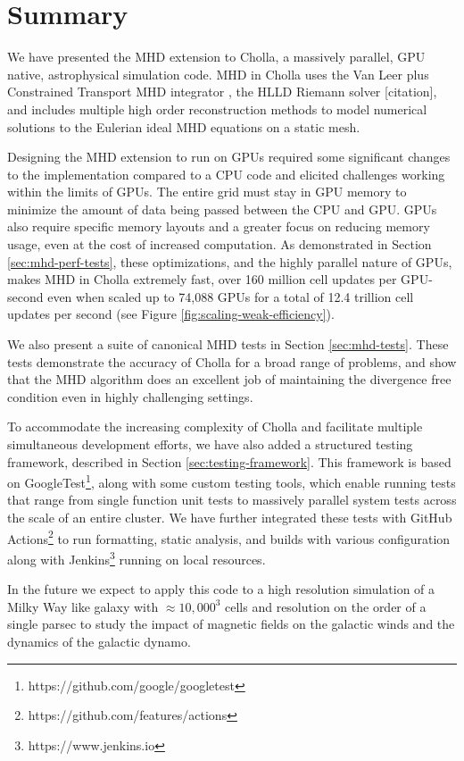 \section{Summary}
\label{sec:summary}

We have presented the MHD extension to Cholla, a massively parallel, GPU native, astrophysical simulation code. MHD in Cholla uses the Van Leer plus Constrained Transport MHD integrator \citep{stone_2009}, the HLLD Riemann solver [citation], and includes multiple high order reconstruction methods to model numerical solutions to the Eulerian ideal MHD equations on a static mesh.

Designing the MHD extension to run on GPUs required some significant changes to the implementation compared to a CPU code and elicited challenges working within the limits of GPUs. The entire grid must stay in GPU memory to minimize the amount of data being passed between the CPU and GPU. GPUs also require specific memory layouts and a greater focus on reducing memory usage, even at the cost of increased computation. As demonstrated in Section \ref{sec:mhd-perf-tests}, these optimizations, and the highly parallel nature of GPUs, makes MHD in Cholla extremely fast, over 160 million cell updates per GPU-second even when scaled up to 74,088 GPUs for a total of 12.4 trillion cell updates per second (see Figure \ref{fig:scaling-weak-efficiency}).

We also present a suite of canonical MHD tests in Section \ref{sec:mhd-tests}. These tests demonstrate the accuracy of Cholla for a broad range of problems, and show that the MHD algorithm does an excellent job of maintaining the divergence free condition even in highly challenging settings. 

To accommodate the increasing complexity of Cholla and facilitate multiple simultaneous development efforts,  we have also added a structured testing framework, described in Section \ref{sec:testing-framework}. This framework is based on  GoogleTest\footnote{https://github.com/google/googletest}, along  with some custom testing tools, which enable running tests that range from single function unit tests to massively parallel system tests across the scale of an entire cluster. We have further integrated these tests with GitHub Actions\footnote{https://github.com/features/actions} to run formatting, static analysis, and builds with various configuration along with Jenkins\footnote{https://www.jenkins.io} running on local resources.

In the future we expect to apply this code to a high resolution simulation of a Milky Way like galaxy with $\approx 10,000^3$ cells and resolution on the order of a single parsec to study the impact of magnetic fields on the galactic winds and the dynamics of the galactic dynamo.
